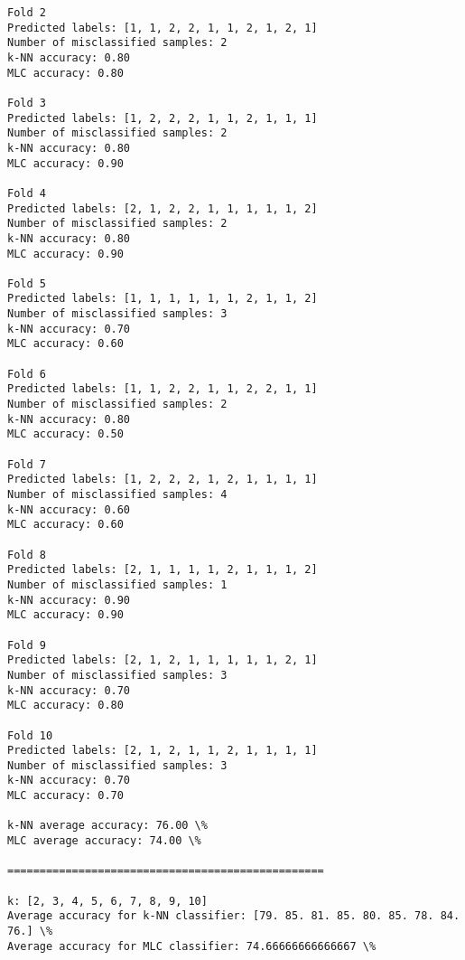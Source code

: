 \documentclass[11pt]{article}
\makeatletter
\newcommand{\boxspacing}{\kern\kvtcb@left@rule\kern\kvtcb@boxsep}
\newcommand{\prompt}[4]{
        {\ttfamily\llap{{\color{#2}[#3]:\hspace{3pt}#4}}\vspace{-\baselineskip}}
    }
\makeatother
\begin{document}
\begin{Verbatim}[commandchars=\\\{\}]
Fold 2
Predicted labels: [1, 1, 2, 2, 1, 1, 2, 1, 2, 1]
Number of misclassified samples: 2
k-NN accuracy: 0.80
MLC accuracy: 0.80

Fold 3
Predicted labels: [1, 2, 2, 2, 1, 1, 2, 1, 1, 1]
Number of misclassified samples: 2
k-NN accuracy: 0.80
MLC accuracy: 0.90

Fold 4
Predicted labels: [2, 1, 2, 2, 1, 1, 1, 1, 1, 2]
Number of misclassified samples: 2
k-NN accuracy: 0.80
MLC accuracy: 0.90

Fold 5
Predicted labels: [1, 1, 1, 1, 1, 1, 2, 1, 1, 2]
Number of misclassified samples: 3
k-NN accuracy: 0.70
MLC accuracy: 0.60

Fold 6
Predicted labels: [1, 1, 2, 2, 1, 1, 2, 2, 1, 1]
Number of misclassified samples: 2
k-NN accuracy: 0.80
MLC accuracy: 0.50

Fold 7
Predicted labels: [1, 2, 2, 2, 1, 2, 1, 1, 1, 1]
Number of misclassified samples: 4
k-NN accuracy: 0.60
MLC accuracy: 0.60

Fold 8
Predicted labels: [2, 1, 1, 1, 1, 2, 1, 1, 1, 2]
Number of misclassified samples: 1
k-NN accuracy: 0.90
MLC accuracy: 0.90

Fold 9
Predicted labels: [2, 1, 2, 1, 1, 1, 1, 1, 2, 1]
Number of misclassified samples: 3
k-NN accuracy: 0.70
MLC accuracy: 0.80

Fold 10
Predicted labels: [2, 1, 2, 1, 1, 2, 1, 1, 1, 1]
Number of misclassified samples: 3
k-NN accuracy: 0.70
MLC accuracy: 0.70

k-NN average accuracy: 76.00 \%
MLC average accuracy: 74.00 \%

=================================================

k: [2, 3, 4, 5, 6, 7, 8, 9, 10]
Average accuracy for k-NN classifier: [79. 85. 81. 85. 80. 85. 78. 84. 76.] \%
Average accuracy for MLC classifier: 74.66666666666667 \%

    \end{Verbatim}

    \begin{tcolorbox}[breakable, size=fbox, boxrule=1pt, pad at break*=1mm,colback=cellbackground, colframe=cellborder]
\prompt{In}{incolor}{ }{\boxspacing}
\begin{Verbatim}[commandchars=\\\{\}]

\end{Verbatim}
\end{tcolorbox}


    
    
    
\end{document}
